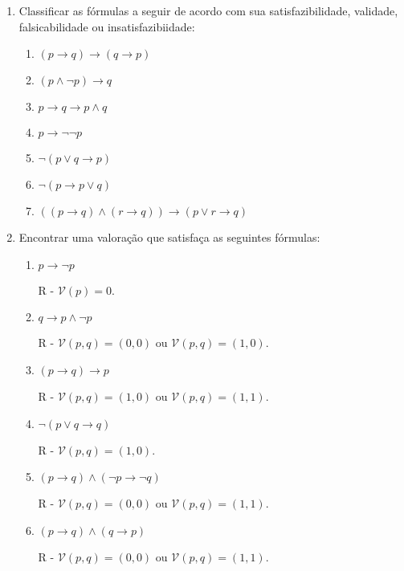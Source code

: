 \documentclass[12pt,a4paper,oneside]{article}
\begin{document}
\begin{enumerate}
	\item Classificar as fórmulas a seguir de acordo com sua satisfazibilidade, validade, falsicabilidade ou insatisfazibiidade:
	
		\begin{enumerate}
			\item $(p \rightarrow q) \rightarrow (q \rightarrow p)$
			\item $(p \wedge \neg p) \rightarrow q$
			\item $p \rightarrow q \rightarrow p \wedge q$
			\item $p \rightarrow \neg \neg p$
			\item $\neg(p \vee q \rightarrow p)$
			\item $\neg(p \rightarrow p \vee q)$
			\item $((p \rightarrow q) \wedge (r \rightarrow q)) \rightarrow (p \vee r \rightarrow q)$
		\end{enumerate}
	
	\item Encontrar uma valoração que satisfaça as seguintes fórmulas:
	
		\begin{enumerate}
			\item $p \rightarrow \neg p$ 
			
			{\color{verde} R - $\mathcal{V}(p)=0$.}
			
			\item $q \rightarrow p \wedge \neg p$
			
			{\color{verde} R - $\mathcal{V}(p,q)=(0,0)$ ou $\mathcal{V}(p,q)=(1,0)$.}
			
			\item $(p \rightarrow q) \rightarrow p$
			
			{\color{verde} R - $\mathcal{V}(p,q)=(1,0)$ ou $\mathcal{V}(p,q)=(1,1)$.}			
			
			\item $\neg(p \vee q \rightarrow q)$
			
			{\color{verde} R - $\mathcal{V}(p,q)=(1,0)$.}			
			
			\item $(p \rightarrow q) \wedge (\neg p \rightarrow \neg q)$
			
			{\color{verde} R - $\mathcal{V}(p,q)=(0,0)$ ou $\mathcal{V}(p,q)=(1,1)$.}
			
			\item $(p \rightarrow q) \wedge (q \rightarrow p)$
			
			{\color{verde} R - $\mathcal{V}(p,q)=(0,0)$ ou $\mathcal{V}(p,q)=(1,1)$.}
			

\end{enumerate}
\end{enumerate}
\end{document}
